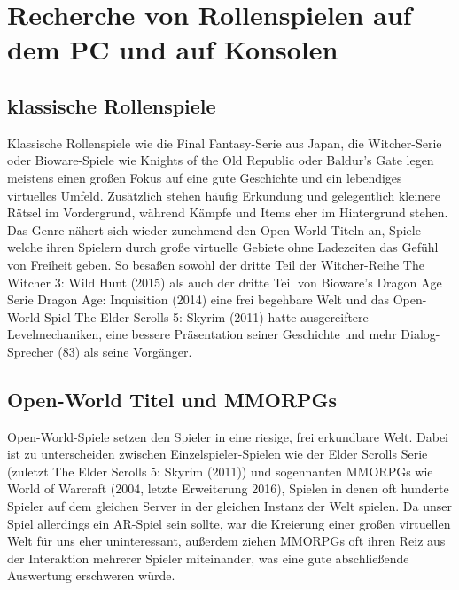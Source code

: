 \documentclass[extern,palatino]{cgBA}
\begin{document}
\section{Recherche von Rollenspielen auf dem PC und auf Konsolen}
\subsection{klassische Rollenspiele}
Klassische Rollenspiele wie die Final Fantasy-Serie aus Japan, die Witcher-Serie oder Bioware-Spiele wie Knights of the Old Republic oder Baldur's Gate legen meistens einen großen Fokus auf eine gute Geschichte und ein lebendiges virtuelles Umfeld. Zusätzlich stehen häufig Erkundung und gelegentlich kleinere Rätsel im Vordergrund, während Kämpfe und Items eher im Hintergrund stehen. 
\\Das Genre nähert sich wieder zunehmend den Open-World-Titeln an, Spiele welche ihren Spielern durch große virtuelle Gebiete ohne Ladezeiten das Gefühl von Freiheit geben. So besaßen sowohl der dritte Teil der Witcher-Reihe The Witcher 3: Wild Hunt (2015) als auch der dritte Teil von Bioware's Dragon Age Serie Dragon Age: Inquisition (2014) eine frei begehbare Welt und das Open-World-Spiel The Elder Scrolls 5: Skyrim (2011) hatte ausgereiftere Levelmechaniken, eine bessere Präsentation seiner Geschichte und mehr Dialog-Sprecher (83) als seine Vorgänger. %

\subsection{Open-World Titel und MMORPGs}
Open-World-Spiele setzen den Spieler in eine riesige, frei erkundbare Welt. Dabei ist zu unterscheiden zwischen Einzelspieler-Spielen wie der Elder Scrolls Serie (zuletzt The Elder Scrolls 5: Skyrim (2011)) und sogennanten MMORPGs wie World of Warcraft (2004, letzte Erweiterung 2016), Spielen in denen oft hunderte Spieler auf dem gleichen Server in der gleichen Instanz der Welt spielen. Da unser Spiel allerdings ein AR-Spiel sein sollte, war die Kreierung einer großen virtuellen Welt für uns eher uninteressant, außerdem ziehen MMORPGs oft ihren Reiz aus der Interaktion mehrerer Spieler miteinander, was eine gute abschließende Auswertung erschweren würde.
\end{document}
